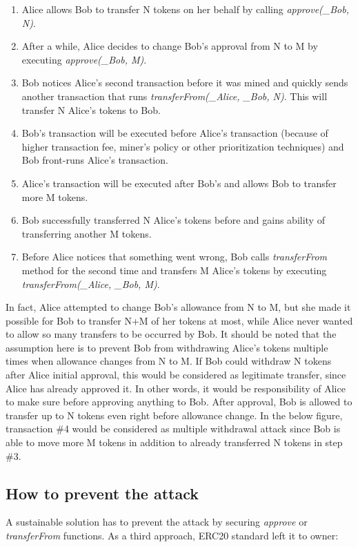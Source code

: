 \begin{enumerate}
	\item Alice allows Bob to transfer N tokens on her behalf by calling \textit{approve(\_Bob, N)}.
	\item After a while, Alice decides to change Bob's approval from N to M by executing \textit{approve(\_Bob, M)}.
	\item Bob notices Alice’s second transaction before it was mined and quickly sends another transaction that runs \textit{transferFrom(\_Alice, \_Bob, N)}. This will transfer N Alice’s tokens to Bob.
	\item Bob’s transaction will be executed before Alice’s transaction (because of higher transaction fee, miner’s policy or other prioritization techniques) and Bob front-runs Alice’s transaction.
	\item Alice’s transaction will be executed after Bob’s and allows Bob to transfer more M tokens.
	\item Bob successfully transferred N Alice’s tokens before and gains ability of transferring another M tokens.
	\item Before Alice notices that something went wrong, Bob calls \textit{transferFrom} method for the second time and transfers M Alice’s tokens by executing \textit{transferFrom(\_Alice, \_Bob, M)}.
\end{enumerate}
In fact, Alice attempted to change Bob’s allowance from N to M, but she made it possible for Bob to transfer N+M of her tokens at most, while Alice never wanted to allow so many transfers to be occurred by Bob. It should be noted that the assumption here is to prevent Bob from withdrawing Alice’s tokens multiple times when allowance changes from N to M. If Bob could withdraw N tokens after Alice initial approval, this would be considered as legitimate transfer, since Alice has already approved it. In other words, it would be responsibility of Alice to make sure before approving anything to Bob. After approval, Bob is allowed to transfer up to N tokens even right before allowance change. In the below figure, transaction \#4 would be considered as multiple withdrawal attack since Bob is able to move more M tokens in addition to already transferred N tokens in step \#3.



\subsection{How to prevent the attack}
A sustainable solution has to prevent the attack by securing \textit{approve} or \textit{transferFrom} functions. As a third approach, ERC20 standard left it to owner:\newline

